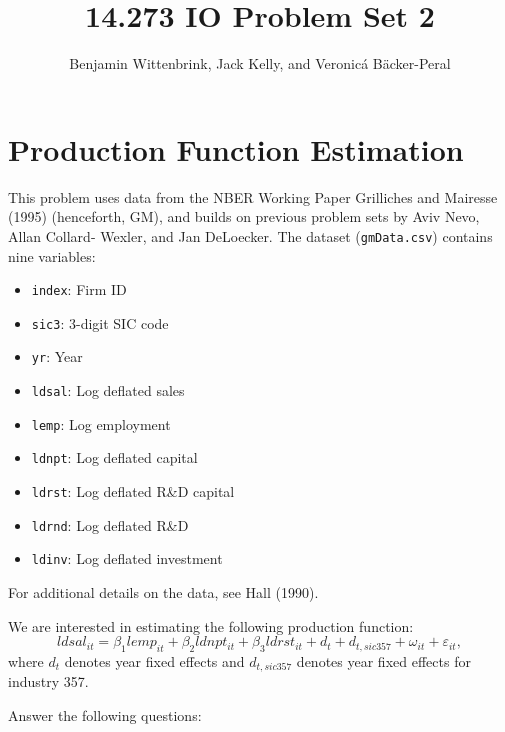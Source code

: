 \documentclass{article}
\title{14.273 IO Problem Set 2}
\author{Benjamin Wittenbrink, Jack Kelly, and Veronicá Bäcker-Peral}
\begin{document}
\maketitle

\section{Production Function Estimation}

This problem uses data from the NBER Working Paper Grilliches and Mairesse (1995) (henceforth, GM), and builds on previous problem sets by Aviv Nevo, Allan Collard-
Wexler, and Jan DeLoecker. The dataset (\texttt{gmData.csv}) contains nine variables: 
\begin{itemize}
\item \texttt{index}: Firm ID
\item \texttt{sic3}: 3-digit SIC code
\item \texttt{yr}: Year
\item \texttt{ldsal}: Log deflated sales
\item \texttt{lemp}: Log employment
\item \texttt{ldnpt}: Log deflated capital 
\item \texttt{ldrst}: Log deflated R\&D capital
\item \texttt{ldrnd}: Log deflated R\&D
\item \texttt{ldinv}: Log deflated investment
\end{itemize}
For additional details on the data, see Hall (1990). 

We are interested in estimating the following production function:
\begin{equation}\label{p1_prod_fn}
ldsal_{it} = \beta_1lemp_{it} + \beta_2ldnpt_{it} + \beta_3ldrst_{it} + d_t + d_{t, sic357} + \omega_{it} + \varepsilon_{it},
\end{equation}
where $d_t$ denotes year fixed effects and $ d_{t, sic357}$ denotes year fixed effects for industry 357. 

Answer the following questions:
\end{document}
